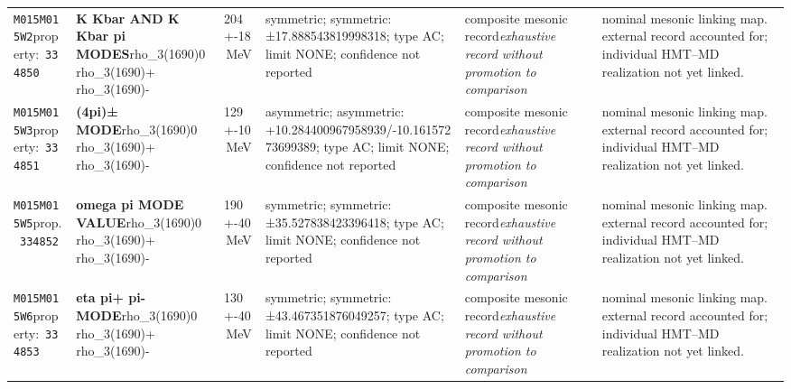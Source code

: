 \begin{landscape}
\begin{longtable}{L{1.85cm}L{4.45cm}L{2.35cm}L{4.05cm}L{3.35cm}L{7.15cm}}
\texttt{M015}\newline \texttt{M015W2}\newline property:\ \texttt{334850} & \textbf{K Kbar AND K Kbar pi MODES}\newline rho\_\allowbreak{}3(1690)0 \textbar{}\allowbreak{} rho\_\allowbreak{}3(1690)+ \textbar{}\allowbreak{} rho\_\allowbreak{}3(1690)- & 204+-18\,MeV & symmetric; symmetric: ±17.888543819998318; type AC; limit NONE; confidence not reported & composite mesonic record\newline \emph{exhaustive record without promotion to comparison} & nominal mesonic linking map. external record accounted for; individual HMT--MD realization not yet linked. \\
\texttt{M015}\newline \texttt{M015W3}\newline property:\ \texttt{334851} & \textbf{(4pi)± MODE}\newline rho\_\allowbreak{}3(1690)0 \textbar{}\allowbreak{} rho\_\allowbreak{}3(1690)+ \textbar{}\allowbreak{} rho\_\allowbreak{}3(1690)- & 129+-10\,MeV & asymmetric; asymmetric: +10.284400967958939/-10.16157273699389; type AC; limit NONE; confidence not reported & composite mesonic record\newline \emph{exhaustive record without promotion to comparison} & nominal mesonic linking map. external record accounted for; individual HMT--MD realization not yet linked. \\
\texttt{M015}\newline \texttt{M015W5}\newline prop.\ \texttt{334852} & \textbf{omega pi MODE VALUE}\newline rho\_\allowbreak{}3(1690)0 \textbar{}\allowbreak{} rho\_\allowbreak{}3(1690)+ \textbar{}\allowbreak{} rho\_\allowbreak{}3(1690)- & 190+-40\,MeV & symmetric; symmetric: ±35.527838423396418; type AC; limit NONE; confidence not reported & composite mesonic record\newline \emph{exhaustive record without promotion to comparison} & nominal mesonic linking map. external record accounted for; individual HMT--MD realization not yet linked. \\
\texttt{M015}\newline \texttt{M015W6}\newline property:\ \texttt{334853} & \textbf{eta pi+ pi- MODE}\newline rho\_\allowbreak{}3(1690)0 \textbar{}\allowbreak{} rho\_\allowbreak{}3(1690)+ \textbar{}\allowbreak{} rho\_\allowbreak{}3(1690)- & 130+-40\,MeV & symmetric; symmetric: ±43.467351876049257; type AC; limit NONE; confidence not reported & composite mesonic record\newline \emph{exhaustive record without promotion to comparison} & nominal mesonic linking map. external record accounted for; individual HMT--MD realization not yet linked. \\

\end{longtable}
\end{landscape}
